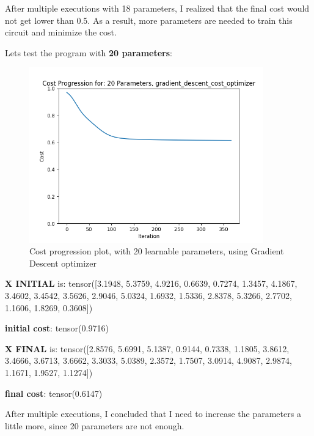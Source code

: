 \documentclass[inscr,ack,preface]{diphdthesis}
\begin{document}
After multiple executions with 18 parameters, I realized that the final cost would not get lower than 0.5. As a result, more parameters are needed to train this circuit and minimize the cost. 

Lets test the program with \textbf{20 parameters}: 

\begin{figure}[ht]
\begin{center}
    \includegraphics[width=0.9\textwidth]{20.png}
    \caption{Cost progression plot, with 20 learnable parameters, using Gradient Descent optimizer} 
    \label{fig:enter-label}
    \end{center}
\end{figure}

\textbf{X INITIAL} is: tensor([3.1948, 5.3759, 4.9216, 0.6639, 0.7274, 1.3457, 4.1867, 3.4602, 3.4542,
        3.5626, 2.9046, 5.0324, 1.6932, 1.5336, 2.8378, 5.3266, 2.7702, 1.1606,
        1.8269, 0.3608])

\textbf{initial cost}: tensor(0.9716)

\textbf{X FINAL} is: tensor([2.8576, 5.6991, 5.1387, 0.9144, 0.7338, 1.1805, 3.8612, 3.4666, 3.6713, 3.6662, 3.3033, 5.0389, 2.3572, 1.7507, 3.0914, 4.9087, 2.9874, 1.1671, 1.9527, 1.1274])

\textbf{final cost}: tensor(0.6147)


After multiple executions, I concluded that I need to increase the parameters a little more, since 20 parameters are not enough.
\end{document}
